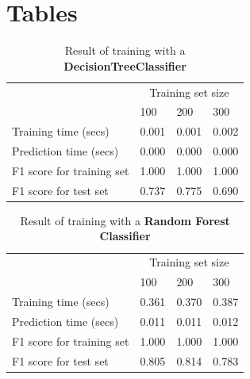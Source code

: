 \documentclass[12pt]{article}
\begin{document}
\section*{Tables}

\setlength{\extrarowheight}{1.5pt}
\begin{table}[!htbp]
\caption{Result of training with a \textbf{DecisionTreeClassifier}} %
\centering %
\begin{tabular}{|p{6cm}|p{1.5cm}|p{1.5cm}|p{1.5cm}|} %
\hline %
& \multicolumn{3}{c|}{Training set size}\\[5pt]
\cline{2-4} 
& 100 & 200 & 300\\[0.5ex]
\hline %

Training time (secs)   &       0.001 & 0.001 & 0.002 \\
Prediction time (secs)   &     0.000 & 0.000 & 0.000 \\
F1 score for training set  &   1.000 & 1.000 & 1.000 \\
F1 score for test set    &     0.737 & 0.775 & 0.690 \\
\hline %
\end{tabular}
\label{decisionTreeTable}
\end{table}

\setlength{\extrarowheight}{1.5pt}
\begin{table}[!htbp]
\caption{Result of training with a \textbf{Random Forest Classifier}} %
\centering %
\begin{tabular}{|p{6cm}|p{1.5cm}|p{1.5cm}|p{1.5cm}|} %
\hline %
& \multicolumn{3}{c|}{Training set size}\\[5pt]
\cline{2-4} 
& 100 & 200 & 300\\[0.5ex]
\hline %

Training time (secs)   &       0.361 & 0.370 & 0.387 \\
Prediction time (secs)   &     0.011 & 0.011 & 0.012 \\
F1 score for training set  &   1.000 & 1.000 & 1.000 \\
F1 score for test set    &     0.805 & 0.814 & 0.783 \\
\hline %
\end{tabular}
\label{randomForestClassifierTable}
\end{table}
\end{document}
